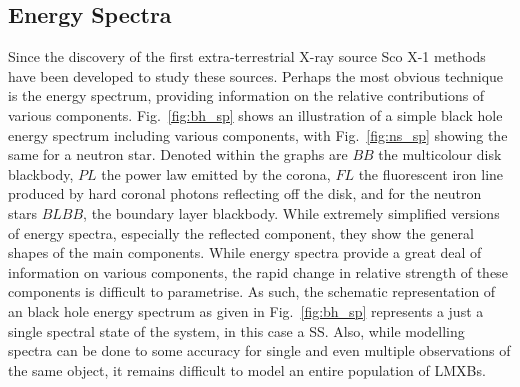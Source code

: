 \subsection{Energy Spectra}
Since the discovery of the first extra-terrestrial X-ray source Sco X-1 \citep{giacconi1962evidence} methods have been developed to study these sources. Perhaps the most obvious technique is the energy spectrum, providing information on the relative contributions of various components. Fig.~\ref{fig:bh_sp} shows an illustration of a simple black hole energy spectrum including various components, with Fig.~\ref{fig:ns_sp} showing the same for a neutron star. Denoted within the graphs are $BB$ the multicolour disk blackbody, $PL$ the power law emitted by the corona, $FL$ the fluorescent iron line produced by hard coronal photons reflecting off the disk, and for the neutron stars $BLBB$, the boundary layer blackbody. While extremely simplified versions of energy spectra, especially the reflected component, they show the general shapes of the main components. While energy spectra provide a great deal of information on various components, the rapid change in relative strength of these components is difficult to parametrise. As such, the schematic representation of an black hole energy spectrum as given in Fig.~\ref{fig:bh_sp} represents a just a single spectral state of the system, in this case a \ac{SS}. Also, while modelling spectra can be done to some accuracy for single and even multiple observations of the same object, it remains difficult to model an entire population of \acp{LMXB}.\\

